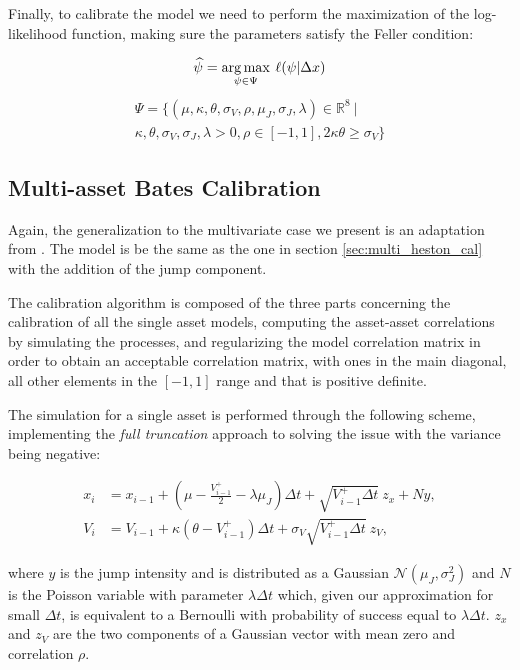 Finally, to calibrate the model we need to perform the maximization of the log-likelihood function, making sure the parameters satisfy the Feller condition:

\begin{equation}
\widehat{\psi} = \operatorname*{arg\,max}_{\psi \in \Psi} \:\ell(\psi |  \Delta x)
\end{equation}
\begin{multline}
\Psi = \{ (\mu, \kappa, \theta, \sigma_V, \rho, \mu_J, \sigma_J, \lambda) \in \mathbb{R}^8 \: |\: \\
\kappa,\theta,\sigma_V,\sigma_J, \lambda >0, \rho \in [-1,1], 2\kappa\theta \geq \sigma_V \}
\end{multline}

\subsection{Multi-asset Bates Calibration}
Again, the generalization to the multivariate case we present is an adaptation from \citep{PARSIMONIOUS2011}. The model is be the same as the one in section \ref{sec:multi_heston_cal} with the addition of the jump component.

The calibration algorithm is composed of the three parts concerning the calibration of all the single asset models, computing the asset-asset correlations by simulating the processes, and regularizing the model correlation matrix in order to obtain an acceptable correlation matrix, with ones in the main diagonal, all other elements in the $[-1,1]$ range and that is positive definite.

The simulation for a single asset is performed through the following scheme, implementing the \textit{full truncation} approach to solving the issue with the variance being negative:

\begin{subequations}
	\label{eq:bates_sim}
	\begin{align}
	x_i &= x_{i-1} + (\mu -  \frac{V_{i-1}^+}{2}- \lambda \mu_J)\Delta t + \sqrt{V_{i-1}^+ \Delta t} \:z_x + N y, \\
	V_i &= V_{i-1} + \kappa(\theta - V_{i-1}^+ )\Delta t + \sigma_V \sqrt{V_{i-1}^+ \Delta t} \: z_V,
	\end{align}
\end{subequations}

where $y$ is the jump intensity and is distributed as a Gaussian $\mathcal{N}(\mu_J, \sigma_J^2)$ and $N$ is the Poisson variable with parameter $\lambda \Delta t$ which, given our approximation for small $\Delta t$, is equivalent to a Bernoulli with probability of success equal to $\lambda \Delta t$. 
$z_x$ and $z_V$ are the two components of a Gaussian vector with mean zero and correlation $\rho$.

